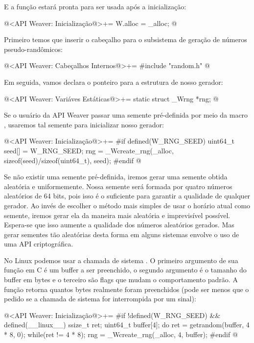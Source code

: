 E a função estará pronta para ser usada após a inicialização:

\iniciocodigo
@<API Weaver: Inicialização@>+=
W.alloc = _alloc;
@
\fimcodigo


Primeiro temos que inserir o cabeçalho para o subsistema de geração de
números pseudo-randômicos:

\iniciocodigo
@<API Weaver: Cabeçalhos Internos@>+=
#include "random.h"
@
\fimcodigo

Em seguida, vamos declara o ponteiro para a estrutura de nosso
gerador:

\iniciocodigo
@<API Weaver: Variáves Estáticas@>+=
static struct _Wrng *rng;
@
\fimcodigo

Se o usuário da API Weaver passar uma semente pré-definida por meio da
macro , usaremos tal semente para inicializar
nosso gerador:

\iniciocodigo
@<API Weaver: Inicialização@>+=
#if defined(W_RNG_SEED)
{
  uint64_t seed[] = W_RNG_SEED;
  rng = _Wcreate_rng(_alloc, sizeof(seed)/sizeof(uint64_t),
                     seed);
}
#endif
@
\fimcodigo

Se não existir uma semente pré-definida, iremos gerar uma semente
obtida aleatória e uniformemente. Nossa semente será formada por
quatro números aleatórios de 64 bits, pois isso é o suficiente para
garantir a qualidade de qualquer gerador. Ao invés de escolher o
método mais simples de usar o horário atual como semente, iremos gerar
ela da maneira mais aleatória e imprevisível possível. Espera-se que
isso aumente a qualidade dos números aleatórios gerados. Mas gerar
sementes tão aleatórias desta forma em alguns sistemas envolve o uso
de uma API criptográfica.

No Linux podemos usar a chamada de sistema . O
primeiro argumento de sua função em C é um buffer a ser preenchido, o
segundo argumento é o tamanho do buffer em bytes e o terceiro são
flags que mudam o comportamento padrão. A função retorna quantos bytes
realmente foram preenchidos (pode ser menos que o pedido se a chamada
de sistema for interrompida por um sinal):

\iniciocodigo
@<API Weaver: Inicialização@>+=
#if !defined(W_RNG_SEED) && defined(__linux__)
{
  ssize_t ret;
  uint64_t buffer[4];
  do{
    ret = getrandom(buffer, 4 * 8, 0);
  }while(ret != 4 * 8);
  rng = _Wcreate_rng(_alloc, 4, buffer);
}
#endif
@
\fimcodigo

